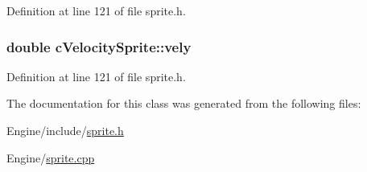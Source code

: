 Definition at line 121 of file sprite.\-h.

\hypertarget{classc_velocity_sprite_a38b6e47912f9b5a385e90e5192850936}{
\subsubsection[{vely}]{\setlength{\rightskip}{0pt plus 5cm}double c\-Velocity\-Sprite\-::vely}}\label{classc_velocity_sprite_a38b6e47912f9b5a385e90e5192850936}


Definition at line 121 of file sprite.\-h.



The documentation for this class was generated from the following files\-:\begin{DoxyCompactItemize}
\item 
Engine/include/\hyperlink{sprite_8h}{sprite.\-h}\item 
Engine/\hyperlink{sprite_8cpp}{sprite.\-cpp}\end{DoxyCompactItemize}
